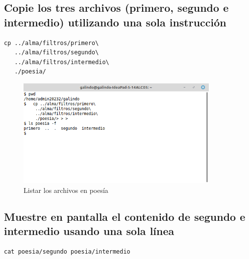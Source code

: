 \documentclass[11pt]{article}
\begin{document}
\subsection{Copie los tres archivos (primero, segundo e intermedio) utilizando una sola instrucción}
\label{sec:org2606518}
\begin{verbatim}
cp ../alma/filtros/primero\
   ../alma/filtros/segundo\
   ../alma/filtros/intermedio\
   ./poesia/
\end{verbatim}

\begin{figure}[htbp]
\centering
\includegraphics[width=10cm]{img/a6.png}
\caption{Listar los archivos en poesía}
\end{figure}

\subsection{Muestre en pantalla el contenido de segundo e intermedio usando una sola línea}
\label{sec:org4dcbdb8}
\begin{verbatim}
cat poesia/segundo poesia/intermedio
\end{verbatim}
\end{document}
